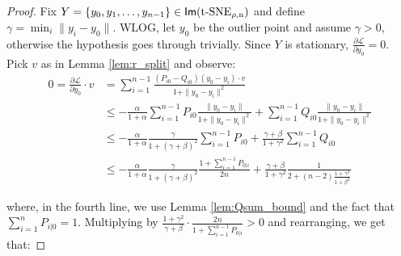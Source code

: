 \OutlierAbs*
\begin{proof}
Fix $Y = \{y_0, y_1,\dots, y_{n-1}\} \in \operatorname*{\mathsf{Im}({\operatorname*{t-SNE}}_{\rho,n})}$ and define \(\gamma = \min_i \|y_i-y_0\|\). WLOG, let \(y_0\) be the outlier point and assume $\gamma > 0$, otherwise the hypothesis goes through trivially.
    Since \(Y\) is stationary, \(\frac{\partial \mathcal{L}}{\partial y_0} = 0\). Pick \(v\) as in Lemma \ref{lem:r_split} and observe:
    \begin{align*}
        0 = \frac{\partial \mathcal{L}}{\partial y_0}\cdot v &= \sum_{i=1}^{n-1} \frac{(P_{i0} - Q_{i0})(y_0-y_i)\cdot v}{1 + \|y_0-y_i\|^2} \\
        &\leq -\frac{\alpha}{1+\alpha}\sum_{i=1}^{n-1}  P_{i0} \frac{\|y_0-y_i\|}{1 + \|y_0-y_i\|^2} + \sum_{i=1}^{n-1} Q_{i0} \frac{\|y_0-y_i\|}{1 + \|y_0-y_i\|^2}\\
        &\leq -\frac{\alpha}{1 + \alpha}  \frac{\gamma}{1+(\gamma+\beta)^2}\sum_{i=1}^{n-1} P_{i0}
        + \frac{\gamma + \beta}{1 + \gamma^2}\sum_{i=1}^{n-1} Q_{i0} \\
        &\leq  -\frac{\alpha}{1+\alpha}\frac{\gamma}{1+(\gamma+\beta)^2}\frac{1 + \sum_{i=1}^{n-1} P_{0|i}}{2n}
        + \frac{\gamma + \beta}{1 + \gamma^2}\frac{1}{2 + (n-2)\frac{1+\gamma^2}{1 + \beta^2}}
    \end{align*}

where, in the fourth line, we use Lemma \ref{lem:Qsum_bound} and the fact that \(\sum_{i=1}^n P_{i|0} = 1\). Multiplying by $\frac{1+\gamma^2}{\gamma+\beta}\cdot \frac{2n}{1 + \sum_{i=1}^{n-1} P_{0|i}} > 0$ and rearranging, we get that:
    

\end{proof}
